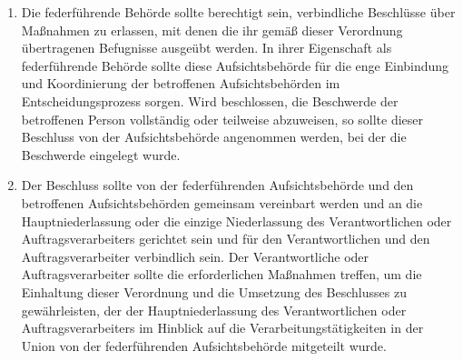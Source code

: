 \begin{enumerate}

   \item Die federführende Behörde sollte berechtigt sein, verbindliche Beschlüsse über Maßnahmen zu erlassen, mit denen
    die ihr gemäß dieser Verordnung übertragenen Befugnisse ausgeübt werden. In ihrer Eigenschaft als federführende
    Behörde sollte diese Aufsichtsbehörde für die enge Einbindung und Koordinierung der betroffenen Aufsichtsbehörden
    im Entscheidungsprozess sorgen. Wird beschlossen, die Beschwerde der betroffenen Person vollständig oder teilweise
    abzuweisen, so sollte dieser Beschluss von der Aufsichtsbehörde angenommen werden, bei der die Beschwerde eingelegt
    wurde.%
   \label{itm:eg-125}
   

   \item Der Beschluss sollte von der federführenden Aufsichtsbehörde und den betroffenen Aufsichtsbehörden gemeinsam
    vereinbart werden und an die Hauptniederlassung oder die einzige Niederlassung des Verantwortlichen oder
    Auftragsverarbeiters gerichtet sein und für den Verantwortlichen und den Auftragsverarbeiter verbindlich sein. Der
    Verantwortliche oder Auftragsverarbeiter sollte die erforderlichen Maßnahmen treffen, um die Einhaltung dieser
    Verordnung und die Umsetzung des Beschlusses zu gewährleisten, der der Hauptniederlassung des Verantwortlichen oder
    Auftragsverarbeiters im Hinblick auf die Verarbeitungstätigkeiten in der Union von der federführenden
    Aufsichtsbehörde mitgeteilt wurde.%
   \label{itm:eg-126}
   


\end{enumerate}
